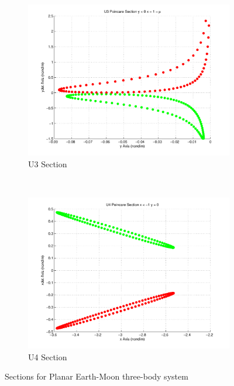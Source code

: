 \begin{figure}
\begin{subfigure}[b]{0.25\textwidth}
                \label{fig:u2_poincare}
        \end{subfigure}~
        \begin{subfigure}[b]{0.25\textwidth}
                \includegraphics[width=\columnwidth]{figures/2015_AAS/U3_poincare}
                \caption{U3 Section}
                \label{fig:u3_poincare}
        \end{subfigure}%
        ~%
        \begin{subfigure}[b]{0.25\textwidth}
                \includegraphics[width=\columnwidth]{figures/2015_AAS/U4_poincare}
                \caption{U4 Section}
                \label{fig:u4_poincare}
        \end{subfigure}
        \caption{\Poincare Sections for Planar Earth-Moon three-body system}
	\label{fig:poincare_sections}
\end{figure}

